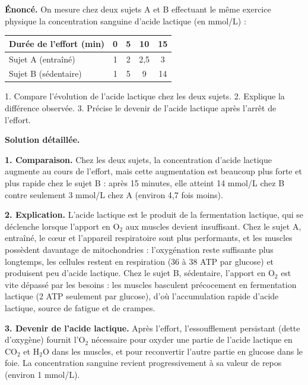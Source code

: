\documentclass[11pt]{article}
\begin{document}
\begin{exoresolu}
\textbf{Énoncé.} On mesure chez deux sujets A et B effectuant le même exercice physique la concentration sanguine d'acide lactique (en mmol/L) :

\begin{center}
\begin{tabular}{|l|c|c|c|c|}\hline
Durée de l'effort (min) & 0 & 5 & 10 & 15 \\ \hline
Sujet A (entraîné) & 1 & 2 & 2,5 & 3 \\ \hline
Sujet B (sédentaire) & 1 & 5 & 9 & 14 \\ \hline
\end{tabular}
\end{center}

1. Compare l'évolution de l'acide lactique chez les deux sujets.
2. Explique la différence observée.
3. Précise le devenir de l'acide lactique après l'arrêt de l'effort.

\tcblower
\textbf{Solution détaillée.}

\textbf{1. Comparaison.} Chez les deux sujets, la concentration d'acide lactique augmente au cours de l'effort, mais cette augmentation est beaucoup plus forte et plus rapide chez le sujet B : après 15 minutes, elle atteint 14 mmol/L chez B contre seulement 3 mmol/L chez A (environ 4,7 fois moins).

\textbf{2. Explication.} L'acide lactique est le produit de la fermentation lactique, qui se déclenche lorsque l'apport en O$_2$ aux muscles devient insuffisant. Chez le sujet A, entraîné, le cœur et l'appareil respiratoire sont plus performants, et les muscles possèdent davantage de mitochondries : l'oxygénation reste suffisante plus longtemps, les cellules restent en respiration (36 à 38 ATP par glucose) et produisent peu d'acide lactique. Chez le sujet B, sédentaire, l'apport en O$_2$ est vite dépassé par les besoins : les muscles basculent précocement en fermentation lactique (2 ATP seulement par glucose), d'où l'accumulation rapide d'acide lactique, source de fatigue et de crampes.

\textbf{3. Devenir de l'acide lactique.} Après l'effort, l'essoufflement persistant (dette d'oxygène) fournit l'O$_2$ nécessaire pour oxyder une partie de l'acide lactique en CO$_2$ et H$_2$O dans les muscles, et pour reconvertir l'autre partie en glucose dans le foie. La concentration sanguine revient progressivement à sa valeur de repos (environ 1 mmol/L).
\end{exoresolu}
\end{document}
